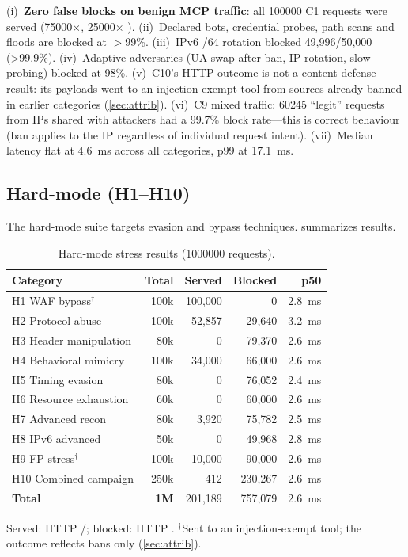 \documentclass[10pt,twocolumn]{article}
\begin{document}
(i)~\textbf{Zero false blocks on benign MCP traffic}: all \num{100000} C1
requests were served (\num{75000}$\times$, \num{25000}$\times$%
). (ii)~Declared bots, credential probes, path scans and floods
are blocked at $>$99\%. (iii)~IPv6 /64 rotation blocked 49,996/50,000
(\textgreater99.9\%). (iv)~Adaptive adversaries (UA swap after ban, IP
rotation, slow probing) blocked at 98\%. (v)~C10's HTTP outcome is not a
content-defense result: its payloads went to an injection-exempt tool from
sources already banned in earlier categories (\cref{sec:attrib}).
(vi)~C9 mixed traffic: \num{60245} ``legit'' requests from IPs shared with
attackers had a 99.7\% block rate---this is correct behaviour (ban applies to
the IP regardless of individual request intent).
(vii)~Median latency flat at \SI{4.6}{ms} across all categories, p99 at
\SI{17.1}{ms}.

\subsection{Hard-mode (H1--H10)}
The hard-mode suite targets evasion and bypass techniques.
 summarizes results.

\begin{table}[t]
\centering\small
\caption{Hard-mode stress results (\num{1000000} requests).}
\label{tab:stresshard}
\setlength{\tabcolsep}{4pt}
\begin{tabularx}{\columnwidth}{@{}l r r r r@{}}
\toprule
Category & Total & Served & Blocked & p50 \\
\midrule
H1 WAF bypass$^\dagger$ & 100k & 100,000 & 0       & \SI{2.8}{ms} \\
H2 Protocol abuse      & 100k & 52,857  & 29,640  & \SI{3.2}{ms} \\
H3 Header manipulation & 80k  & 0       & 79,370  & \SI{2.6}{ms} \\
H4 Behavioral mimicry  & 100k & 34,000  & 66,000  & \SI{2.6}{ms} \\
H5 Timing evasion      & 80k  & 0       & 76,052  & \SI{2.4}{ms} \\
H6 Resource exhaustion & 60k  & 0       & 60,000  & \SI{2.6}{ms} \\
H7 Advanced recon      & 80k  & 3,920   & 75,782  & \SI{2.5}{ms} \\
H8 IPv6 advanced       & 50k  & 0       & 49,968  & \SI{2.8}{ms} \\
H9 FP stress$^\dagger$ & 100k & 10,000  & 90,000  & \SI{2.6}{ms} \\
H10 Combined campaign  & 250k & 412     & 230,267 & \SI{2.6}{ms} \\
\midrule
\textbf{Total}         & \textbf{1M} & 201,189 & 757,079 & \SI{2.6}{ms} \\
\bottomrule
\end{tabularx}
\par\smallskip\footnotesize Served: HTTP /; blocked:
HTTP . $^\dagger$Sent to an injection-exempt tool; the outcome
reflects \sys{} bans only (\cref{sec:attrib}).
\end{table}
\end{document}
